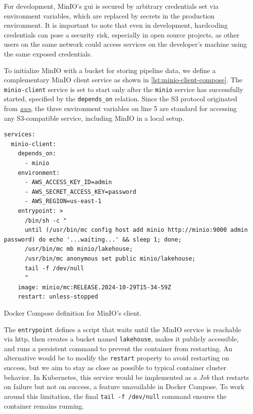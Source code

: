 For development, MinIO's \ac{gui} is secured by arbitrary credentials set via environment variables, which are replaced by secrets in the production environment.
It is important to note that even in development, hardcoding credentials can pose a security risk, especially in open source projects, as other users on the same network could access services on the developer's machine using the same exposed credentials.

To initialize MinIO with a bucket for storing pipeline data, we define a complementary MinIO client service as shown in \cref{lst:minio-client-compose}.
The \texttt{minio-client} service is set to start only after the \texttt{minio} service has successfully started, specified by the \texttt{depends\_on} relation.
Since the S3 protocol originated from \href{https://aws.amazon.com/}{\textit{\ac{aws}}}, the three environment variables on line 5 are standard for accessing any S3-compatible service, including MinIO in a local setup.

\begin{listing}[H]
\begin{verbatim}
services:
  minio-client:
    depends_on:
      - minio
    environment:
      - AWS_ACCESS_KEY_ID=admin
      - AWS_SECRET_ACCESS_KEY=password
      - AWS_REGION=us-east-1
    entrypoint: >
      /bin/sh -c "
      until (/usr/bin/mc config host add minio http://minio:9000 admin password) do echo '...waiting...' && sleep 1; done;
      /usr/bin/mc mb minio/lakehouse;
      /usr/bin/mc anonymous set public minio/lakehouse;
      tail -f /dev/null
      "
    image: minio/mc:RELEASE.2024-10-29T15-34-59Z
    restart: unless-stopped
\end{verbatim}
\caption{Docker Compose definition for MinIO's client.}
\label{lst:minio-client-compose}
\end{listing}

The \texttt{entrypoint} defines a script that waits until the MinIO service is reachable via \ac{http}, then creates a bucket named \texttt{lakehouse}, makes it publicly accessible, and runs a persistent command to prevent the container from restarting.
An alternative would be to modify the \texttt{restart} property to avoid restarting on success, but we aim to stay as close as possible to typical container cluster behavior.
In Kubernetes, this service would be implemented as a \textit{Job} that restarts on failure but not on success, a feature unavailable in Docker Compose.
To work around this limitation, the final \texttt{tail -f /dev/null} command ensures the container remains running.

